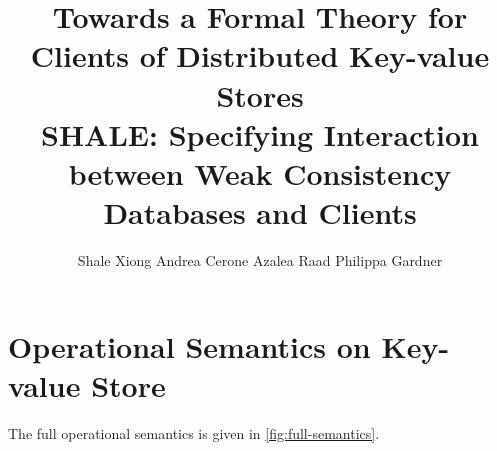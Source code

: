 \documentclass[runningheads]{llncs}
\newcommand{\RootPath}{.}
\newif\ifTechReport
\begin{document}
\title{
	Towards a Formal Theory for Clients of Distributed Key-value Stores \\
    SHALE: Specifying Interaction between Weak Consistency Databases and Clients
    } 

\author{%
Shale Xiong
Andrea Cerone
Azalea Raad
Philippa Gardner
}
%


%

\maketitle

\begin{abstract}
    
\end{abstract}








%




\newpage
\appendix
\ifTechReport
\else
\section{Operational Semantics on Key-value Store}
\label{sec:full-semantics}
The full operational semantics is given in \cref{fig:full-semantics}.






\end{document}
